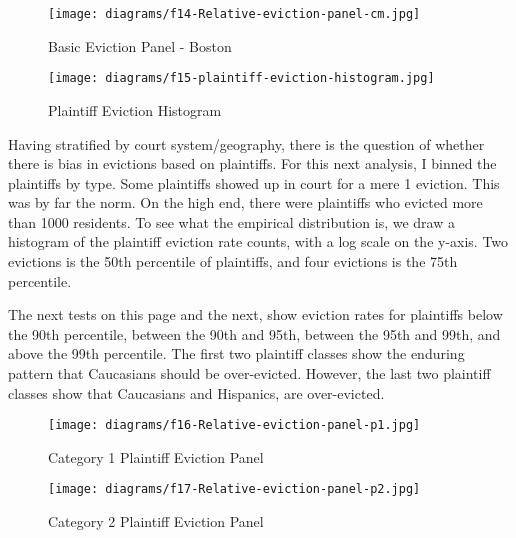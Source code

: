 \begin{figure}
  \begin{center}
    \texttt{[image: diagrams/f14-Relative-eviction-panel-cm.jpg]}
  \end{center}
  \caption{Basic Eviction Panel - Boston}
\label{fig:figure14}
\end{figure}

\begin{wrapfigure}{r}{2in}
\texttt{[image: diagrams/f15-plaintiff-eviction-histogram.jpg]}
\caption{Plaintiff Eviction Histogram}
\label{fig:figure15}
\end{wrapfigure}

\par Having stratified by court system/geography, there is the question of whether there is bias in evictions based on plaintiffs.  For this next analysis, I binned the plaintiffs by type.  Some plaintiffs showed up in court for a mere 1 eviction.  This was by far the norm.  On the high end, there were plaintiffs who evicted more than 1000 residents.  To see what the empirical distribution is, we draw a histogram of the plaintiff eviction rate counts, with a log scale on the y-axis.  Two evictions is the 50th percentile of plaintiffs, and four evictions is the 75th percentile.

\par The next tests on this page and the next, show eviction rates for plaintiffs below the 90th percentile, between the 90th and 95th, between the 95th and 99th, and above the 99th percentile.  The first two plaintiff classes show the enduring pattern that Caucasians should be over-evicted.  However, the last two plaintiff classes show that Caucasians and Hispanics, are over-evicted.

\begin{figure}
  \begin{center}
    \texttt{[image: diagrams/f16-Relative-eviction-panel-p1.jpg]}
  \end{center}
  \caption{Category 1 Plaintiff Eviction Panel}
\label{fig:figure16}
\end{figure}

\begin{figure}
  \begin{center}
    \texttt{[image: diagrams/f17-Relative-eviction-panel-p2.jpg]}
  \end{center}
  \caption{Category 2 Plaintiff Eviction Panel}
\label{fig:figure17}
\end{figure}

